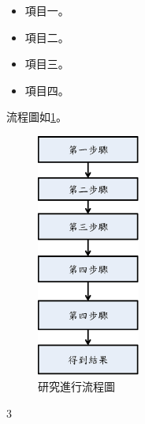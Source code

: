     \begin{itemize}
        \item
        項目一。
        \item
        項目二。
        \item
        項目三。
        \item
        項目四。
    \end{itemize}

    流程圖如\ref{fig:ResearchFlowChart}。
    \begin{figure}[htbp]
        \centering
        \includegraphics[height=8cm]{graphs/introduction/ResearchFlowChart.eps}
        \caption{研究進行流程圖}
        \label{fig:ResearchFlowChart}
    \end{figure}
3
